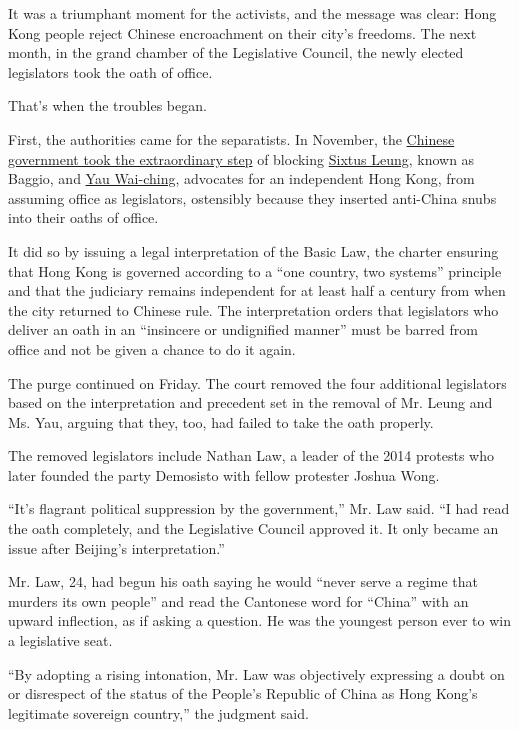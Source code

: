 It was a triumphant moment for the activists, and the message was clear:
Hong Kong people reject Chinese encroachment on their city's freedoms.
The next month, in the grand chamber of the Legislative Council, the
newly elected legislators took the oath of office.

That's when the troubles began.

First, the authorities came for the separatists. In November, the
\href{https://www.nytimes3xbfgragh.onion/2016/11/08/world/asia/china-hong-kong-sixtus-leung-yau-wai-ching.html}{Chinese
government took the extraordinary step} of blocking
\href{http://www.nytimes3xbfgragh.onion/2016/09/02/world/asia/hong-kong-elections-legco.html}{Sixtus
Leung}, known as Baggio, and
\href{https://www.nytimes3xbfgragh.onion/2016/11/05/world/asia/hong-kong-yau-wai-ching.html}{Yau
Wai-ching}, advocates for an independent Hong Kong, from assuming office
as legislators, ostensibly because they inserted anti-China snubs into
their oaths of office.

It did so by issuing a legal interpretation of the Basic Law, the
charter ensuring that Hong Kong is governed according to a ``one
country, two systems'' principle and that the judiciary remains
independent for at least half a century from when the city returned to
Chinese rule. The interpretation orders that legislators who deliver an
oath in an ``insincere or undignified manner'' must be barred from
office and not be given a chance to do it again.

The purge continued on Friday. The court removed the four additional
legislators based on the interpretation and precedent set in the removal
of Mr. Leung and Ms. Yau, arguing that they, too, had failed to take the
oath properly.

The removed legislators include Nathan Law, a leader of the 2014
protests who later founded the party Demosisto with fellow protester
Joshua Wong.

``It's flagrant political suppression by the government,'' Mr. Law said.
``I had read the oath completely, and the Legislative Council approved
it. It only became an issue after Beijing's interpretation.''

Mr. Law, 24, had begun his oath saying he would ``never serve a regime
that murders its own people'' and read the Cantonese word for ``China''
with an upward inflection, as if asking a question. He was the youngest
person ever to win a legislative seat.

``By adopting a rising intonation, Mr. Law was objectively expressing a
doubt on or disrespect of the status of the People's Republic of China
as Hong Kong's legitimate sovereign country,'' the judgment said.

